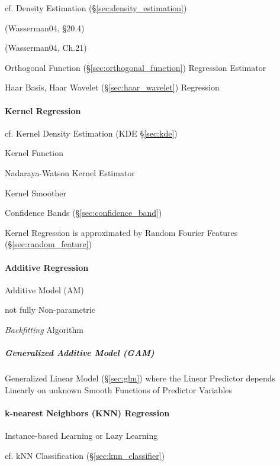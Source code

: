 \fist cf. Density Estimation (\S\ref{sec:density_estimation})

(Wasserman04, \S20.4)

(Wasserman04, Ch.21)

Orthogonal Function (\S\ref{sec:orthogonal_function}) Regression Estimator

Haar Basis, Haar Wavelet (\S\ref{sec:haar_wavelet}) Regression



\paragraph{Kernel Regression}\label{sec:kernel_regression}\hfill

cf. Kernel Density Estimation (KDE \S\ref{sec:kde})

Kernel Function

Nadaraya-Watson Kernel Estimator

Kernel Smoother

Confidence Bands (\S\ref{sec:confidence_band})

Kernel Regression is approximated by Random Fourier Features
(\S\ref{sec:random_feature})



\paragraph{Additive Regression}\label{sec:additive_regression}\hfill

Additive Model (AM)

not fully Non-parametric

\emph{Backfitting} Algorithm



\subparagraph{Generalized Additive Model (GAM)}\label{sec:gam}\hfill

Generalized Linear Model (\S\ref{sec:glm}) where the Linear Predictor depends
Linearly on unknown Smooth Functions of Predictor Variables



\paragraph{k-nearest Neighbors (KNN) Regression}\label{sec:knn_regression}

Instance-based Learning or Lazy Learning

cf. kNN Classification (\S\ref{sec:knn_classifier})



